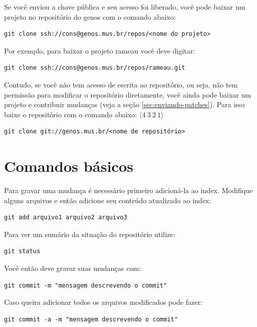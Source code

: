 \documentclass[12pt,brazil]{book}
\begin{document}
Se você enviou a chave pública e seu acesso foi liberado, você pode
baixar um projeto no repositório do genos com o comando abaixo:

\begin{verbatim}
git clone ssh://cons@genos.mus.br/repos/<nome do projeto>
\end{verbatim}

Por exemplo, para baixar o projeto rameau você deve
digitar:

\begin{verbatim}
git clone ssh://cons@genos.mus.br/repos/rameau.git
\end{verbatim}

Contudo, se você não tem acesso de escrita ao repositório, ou seja,
não tem permissão para modificar o repositório diretamente, você ainda
pode baixar um projeto e contribuir mudanças (veja a seção
\ref{sec:enviando-patches}). Para isso baixe o repositório com o
comando abaixo:
$\langle 4 \: 3\:  2\: 1 \rangle$
\begin{verbatim}
git clone git://genos.mus.br/<nome de repositório>
\end{verbatim}

\section{Comandos básicos}
\label{sec:comandos-basicos}

Para gravar uma mudança é necessário primeiro adicioná-la ao
index. Modifique alguns arquivos e então adicione seu conteúdo
atualizado ao index:

\begin{verbatim}
git add arquivo1 arquivo2 arquivo3
\end{verbatim}

Para ver um sumário da situação do repositório utilize:

\begin{verbatim}
git status
\end{verbatim}

Você então deve gravar suas mudanças com:

\begin{verbatim}
git commit -m "mensagem descrevendo o commit"
\end{verbatim}

Caso queira adicionar todos os arquivos modificados pode fazer:

\begin{verbatim}
git commit -a -m "mensagem descrevendo o commit"
\end{verbatim}
\end{document}
